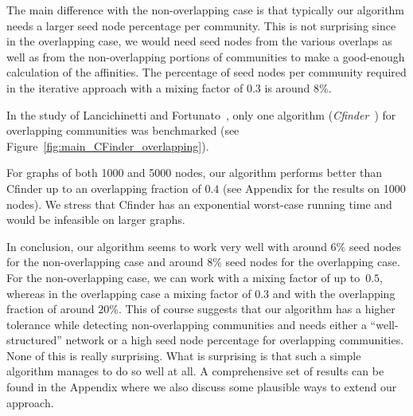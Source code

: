 The main difference with the non-overlapping case is that typically our
algorithm needs a larger seed node percentage per community. This is not
surprising since in the overlapping case, we would need seed nodes from the
various overlaps as well as from the non-overlapping portions of communities to
make a good-enough calculation of the affinities. The percentage of seed nodes
per community required in the iterative approach with a mixing factor of $0.3$
is around 8$\%$.  

In the study of Lancichinetti and Fortunato~\cite{LF09}, only one algorithm
(\emph{Cfinder}~\cite{PDFV05}) for overlapping communities was benchmarked (see
Figure~\ref{fig:main_CFinder_overlapping}). 

For graphs of both 1000 and 5000 nodes, our algorithm performs better 
than Cfinder up to an overlapping fraction of $0.4$ (see Appendix for 
the results on 1000 nodes). We stress that Cfinder 
has an exponential worst-case running time and would be infeasible on 
larger graphs. 

In conclusion, our algorithm seems to work very well with around 6$\%$ seed
nodes for the non-overlapping case and around 8$\%$ seed nodes for the
overlapping case.  For the non-overlapping case, we can work with a mixing
factor of up to~$0.5$, whereas in the overlapping case a mixing factor of $0.3$
and with the overlapping fraction of around $20\%$. This of course suggests that
our algorithm has a higher tolerance while detecting non-overlapping communities
and needs either a ``well-structured'' network or a high seed node percentage
for overlapping communities.  None of this is really surprising. What is
surprising is that such a simple algorithm manages to do so well at all. 
A comprehensive set of results can be found in the Appendix where we also
discuss some plausible ways to extend our approach. 








